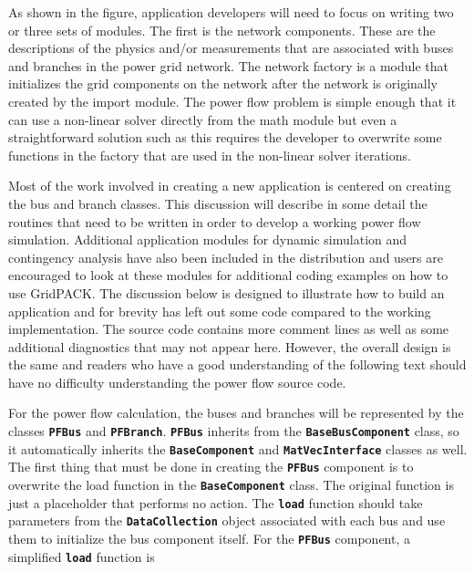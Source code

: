 As shown in the figure, application developers will need to focus on writing two or three sets of modules. The first is the network components. These are the descriptions of the physics and/or measurements that are associated with buses and branches in the power grid network. The network factory is a module that initializes the grid components on the network after the network is originally created by the import module. The power flow problem is simple enough that it can use a non-linear solver directly from the math module but even a straightforward solution such as this requires the developer to overwrite some functions in the factory that are used in the non-linear solver iterations.

Most of the work involved in creating a new application is centered on creating the bus and branch classes. This discussion will describe in some detail the routines that need to be written in order to develop a working power flow simulation. Additional application modules for dynamic simulation and contingency analysis have also been included in the distribution and users are encouraged to look at these modules for additional coding examples on how to use GridPACK. The discussion below is designed to illustrate how to build an application and for brevity has left out some code compared to the working implementation. The source code contains more comment lines as well as some additional diagnostics that may not appear here. However, the overall design is the same and readers who have a good understanding of the following text should have no difficulty understanding the power flow source code.

For the power flow calculation, the buses and branches will be represented by the classes \texttt{\textbf{PFBus}} and \texttt{\textbf{PFBranch}}. \texttt{\textbf{PFBus}} inherits from the \texttt{\textbf{BaseBusComponent}} class, so it automatically inherits the \texttt{\textbf{BaseComponent}} and \texttt{\textbf{MatVecInterface}} classes as well. The first thing that must be done in creating the \texttt{\textbf{PFBus}} component is to overwrite the load function in the \texttt{\textbf{BaseComponent}} class. The original function is just a placeholder that performs no action. The \texttt{\textbf{load}} function should take parameters from the \texttt{\textbf{DataCollection}} object associated with each bus and use them to initialize the bus component itself. For the \texttt{\textbf{PFBus}} component, a simplified \texttt{\textbf{load}} function is

